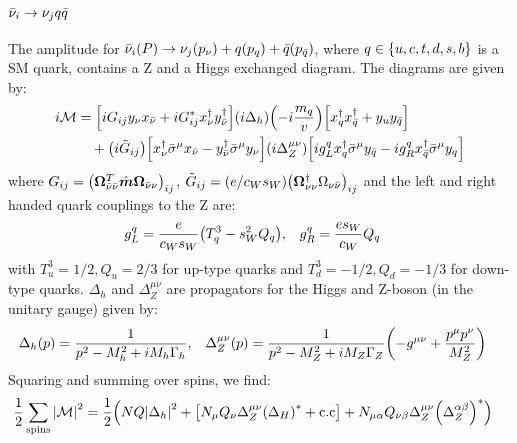 
\subsubsection{\texorpdfstring{\(\bar{\nu}_{i}\to\nu_{j}q\bar{q}\)}{RH-Neutrino to LH-Neutrino and Quarks}}
The amplitude for \(\bar{\nu}_{i}(P) \to \nu_{j}(p_{\nu}) + q(p_{q}) + \bar{q}(p_{\bar{q}})\), where
\(q \in \qty{u,c,t,d,s,b}\) is a SM quark, contains a Z and a Higgs exchanged diagram. The diagrams are given by:
\begin{align}
    i\mathcal{M}
     & =
    \qty[iG_{ij}y_{\nu}x_{\bar{\nu}} + iG^{*}_{ij}x^{\dagger}_{\nu}y^{\dagger}_{\bar{\nu}}]
    \qty(i\Delta_{h})
    \qty(-i\frac{m_{q}}{v})
    \qty[x^{\dagger}_{q}x^{\dagger}_{\bar{q}} + y_{u}y_{\bar{q}}] \\
     & \quad +
    \qty(i\tilde{G}_{ij})
    \qty[x^{\dagger}_{\nu}\bar{\sigma}^{\mu}x_{\bar{\nu}} - y^{\dagger}_{\bar{\nu}}\bar{\sigma}^{\mu}y_{\nu}]
    \qty(i\Delta^{\mu\nu}_{Z})
    \qty[ig^{q}_{L}x^{\dagger}_{q}\bar{\sigma}^{\mu}y_{\bar{q}} -ig^{q}_{R}x^{\dagger}_{\bar{q}}\bar{\sigma}^{\mu}y_{q}]
\end{align}
where \(G_{ij} = \qty(\bm{\Omega}_{\bar{\nu}\bar{\nu}}^{T}\hat{\bm{m}}\bm{\Omega}_{\bar{\nu}\nu})_{ij}\),
\(\tilde{G}_{ij} = (e/c_{W}s_{W})\qty(\bm{\Omega}_{\nu\nu}^{\dagger}\Omega_{\nu\bar{\nu}})_{ij}\) and the left and right handed
quark couplings to the Z are:
\begin{align}
    g^{q}_{L} & = \frac{e}{c_{W}s_{W}}\qty(T^{3}_{q} - s^{2}_{W}Q_{q}), &
    g^{q}_{R} & = \frac{e s_{W}}{c_{W}}Q_{q}
\end{align}
with \(T^{3}_{u} = 1/2, Q_{u}=2/3\) for up-type quarks and
\(T^{3}_{d} = -1/2, Q_{d}=-1/3\) for down-type quarks.
\(\Delta_{h}\) and \(\Delta^{\mu\nu}_{Z}\) are propagators for the Higgs and
Z-boson (in the unitary gauge) given by:
\begin{align}
    \Delta_{h}(p)
                                                   & =
    \frac{1}{p^2 - M^{2}_{h} + i M_{h}\Gamma_{h}}, &
    \Delta^{\mu\nu}_{Z}(p)
                                                   & =
    \frac{1}{p^2 - M^{2}_{Z} + i M_{Z}\Gamma_{Z}}
    \qty(-g^{\mu\nu} + \frac{p^{\mu}p^{\nu}}{M^{2}_{Z}})
\end{align}
Squaring and summing over spins, we find:
\begin{align}
    \frac{1}{2}\sum_{\mathrm{spins}}\qty|\mathcal{M}|^2
     & =
    \frac{1}{2}\qty(
    N Q \qty|\Delta_{h}|^{2}
    + \qty[N_{\mu}Q_{\nu}\Delta^{\mu\nu}_{Z}\qty(\Delta_{H})^{*} + \mathrm{c.c}]
    + N_{\mu\alpha} Q_{\nu\beta}\Delta_{Z}^{\mu\nu}\qty(\Delta_{Z}^{\alpha\beta})^{*}
    )
\end{align}
